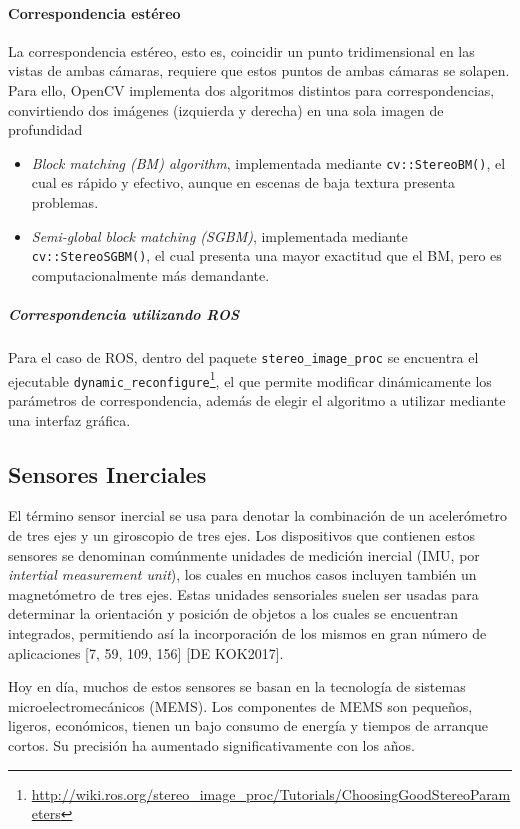 \paragraph{Correspondencia estéreo}
La correspondencia estéreo, esto es, coincidir un punto tridimensional en las vistas de ambas cámaras, requiere que estos puntos de ambas cámaras se solapen. Para ello, OpenCV implementa dos algoritmos distintos para correspondencias, convirtiendo dos imágenes (izquierda y derecha) en una sola imagen de profundidad
\begin{itemize}
    \item \textit{Block matching (BM) algorithm}, implementada mediante \texttt{cv::StereoBM()}, el cual es rápido y efectivo, aunque en escenas de baja textura presenta problemas. 
    \item \textit{Semi-global block matching (SGBM)}, implementada mediante \texttt{cv::StereoSGBM()}, el cual presenta una mayor exactitud que el BM, pero es computacionalmente más demandante.
\end{itemize}
\subparagraph{Correspondencia utilizando ROS}
Para el caso de ROS, dentro del paquete \texttt{stereo\_image\_proc} se encuentra el ejecutable \texttt{dynamic\_reconfigure}\footnote{\url{http://wiki.ros.org/stereo_image_proc/Tutorials/ChoosingGoodStereoParameters}}, el que permite modificar dinámicamente los parámetros de correspondencia, además de elegir el algoritmo a utilizar mediante una interfaz gráfica.

\subsection{Sensores Inerciales}
El término sensor inercial se usa para denotar la combinación de un acelerómetro de tres ejes y un giroscopio de tres ejes. Los dispositivos que contienen estos sensores se denominan comúnmente unidades de medición inercial (IMU, por \textit{intertial measurement unit}), los cuales en muchos casos incluyen también un magnetómetro de tres ejes. Estas unidades sensoriales suelen ser usadas para determinar la orientación y posición de objetos a los cuales se encuentran integrados, permitiendo así la incorporación de los mismos en gran número de aplicaciones [7, 59, 109, 156] [DE KOK2017].

Hoy en día, muchos de estos sensores se basan en la tecnología de sistemas microelectromecánicos (MEMS). Los componentes de MEMS son pequeños, ligeros, económicos, tienen un bajo consumo de energía y tiempos de arranque cortos. Su precisión ha aumentado significativamente con los años.

